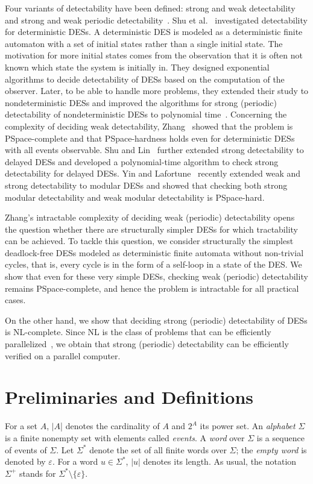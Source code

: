 \documentclass[twocolumn,amsthm]{autartx}
\begin{document}
  Four variants of detectability have been defined: strong and weak detectability and strong and weak periodic detectability~\cite{ShuLinYing2007}. Shu et al.~\cite{ShuLinYing2007} investigated detectability for deterministic DESs. A deterministic DES is modeled as a deterministic finite automaton with a set of initial states rather than a single initial state. The motivation for more initial states comes from the observation that it is often not known which state the system is initially in. They designed exponential algorithms to decide detectability of DESs based on the computation of the observer.
% 
  Later, to be able to handle more problems, they extended their study to nondeterministic DESs and improved the algorithms for strong (periodic) detectability of nondeterministic DESs to polynomial time~\cite{ShuLin2011}. Concerning the complexity of deciding weak detectability, Zhang~\cite{Zhang17} showed that the problem is PSpace-complete and that PSpace-hardness holds even for deterministic DESs with all events observable.
% 
  Shu and Lin~\cite{ShuLin2013} further extended strong detectability to delayed DESs and developed a polynomial-time algorithm to check strong detectability for delayed DESs.
% 
  Yin and Lafortune~\cite{YinLafortune17} recently extended weak and strong detectability to modular DESs and showed that checking both strong modular detectability and weak modular detectability is PSpace-hard.

  Zhang's intractable complexity of deciding weak (periodic) detectability opens the question whether there are structurally simpler DESs for which tractability can be achieved. To tackle this question, we consider structurally the simplest deadlock-free DESs modeled as deterministic finite automata without non-trivial cycles, that is, every cycle is in the form of a self-loop in a state of the DES. We show that even for these very simple DESs, checking weak (periodic) detectability remains PSpace-complete, and hence the problem is intractable for all practical cases.

  On the other hand, we show that deciding strong (periodic) detectability of DESs is NL-complete. Since NL is the class of problems that can be efficiently parallelized~\cite{AroraBarak2009}, we obtain that strong (periodic) detectability can be efficiently verified on a parallel computer. 


\section{Preliminaries and Definitions}
  For a set $A$, $|A$| denotes the cardinality of $A$ and $2^{A}$ its power set. An {\em alphabet\/} $\Sigma$ is a finite nonempty set with elements called {\em events}. A {\em word\/} over $\Sigma$ is a sequence of events of $\Sigma$. Let $\Sigma^*$ denote the set of all finite words over $\Sigma$; the {\em empty word\/} is denoted by $\varepsilon$. For a word $u \in \Sigma^*$, $|u|$ denotes its length. As usual, the notation $\Sigma^+$ stands for $\Sigma^*\setminus\{\varepsilon\}$.
\end{document}
